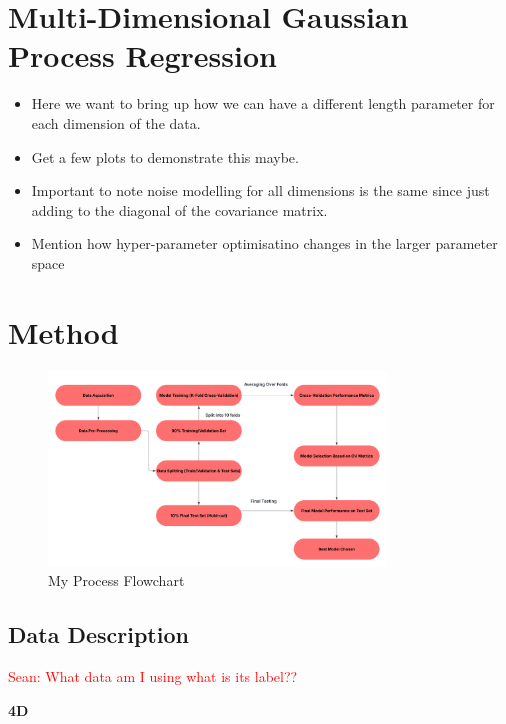 \documentclass{article}
\newcommand{\Sean}[1]{{\textcolor{red}{{Sean: #1}} }}
\begin{document}
\section{Multi-Dimensional Gaussian Process Regression}

\begin{itemize}
    \item Here we want to bring up how we can have a different length parameter for each dimension of the data.
    \item Get a few plots to demonstrate this maybe.
    \item Important to note noise modelling for all dimensions is the same since just adding to the diagonal of the covariance matrix.
    \item Mention how hyper-parameter optimisatino changes in the larger parameter space
\end{itemize}


\section{Method}

\begin{figure}[H]
    \centering
    \includegraphics[width=0.8\textwidth]{LatexPlots/Flowchart.png}
    \caption{My Process Flowchart}
    \label{fig:flowchart}
\end{figure}

\subsection{Data Description}
\Sean{What data am I using what is its label??}

\noindent
\textbf{4D}
\end{document}

